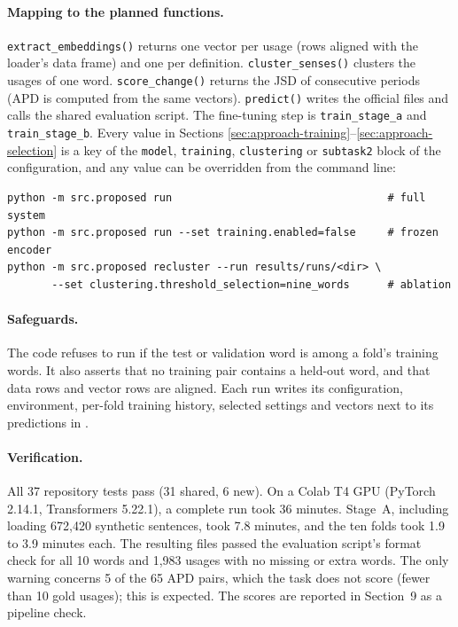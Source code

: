 \paragraph{Mapping to the planned functions.}
\texttt{extract\_embeddings()} returns one vector per usage (rows aligned with the
loader's data frame) and one per definition. \texttt{cluster\_senses()} clusters
the usages of one word. \texttt{score\_change()} returns the JSD of consecutive
periods (APD is computed from the same vectors). \texttt{predict()} writes the
official files and calls the shared evaluation script. The fine-tuning step is
\texttt{train\_stage\_a} and \texttt{train\_stage\_b}. Every value in Sections
\ref{sec:approach-training}--\ref{sec:approach-selection} is a key of the
\texttt{model}, \texttt{training}, \texttt{clustering} or \texttt{subtask2} block of
the configuration, and any value can be overridden from the command line:
\begin{verbatim}
python -m src.proposed run                                  # full system
python -m src.proposed run --set training.enabled=false     # frozen encoder
python -m src.proposed recluster --run results/runs/<dir> \
       --set clustering.threshold_selection=nine_words      # ablation
\end{verbatim}

\paragraph{Safeguards.} The code refuses to run if the test or validation word is
among a fold's training words. It also asserts that no training pair contains a
held-out word, and that data rows and vector rows are aligned. Each run writes
its configuration, environment, per-fold training history, selected settings and
vectors next to its predictions in .

\paragraph{Verification.} All 37 repository tests pass (31 shared, 6 new). On a
Colab T4 GPU (PyTorch 2.14.1, Transformers 5.22.1), a complete run took 36
minutes. Stage~A, including loading 672{,}420 synthetic sentences, took 7.8
minutes, and the ten folds took 1.9 to 3.9 minutes each. The resulting files
passed the evaluation script's format check for all 10 words and 1{,}983 usages
with no missing or extra words. The only warning concerns 5 of the 65 APD pairs,
which the task does not score (fewer than 10 gold usages); this is expected. The
scores are reported in Section~9 as a pipeline check.
